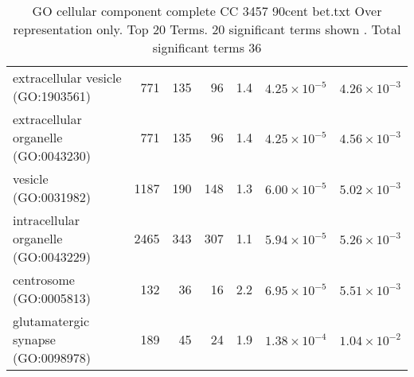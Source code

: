 \begin{table}[ht]
\begin{adjustbox}{width=\textwidth}
\begin{tabular}{lrrrrrr}
  extracellular vesicle (GO:1903561) & 771 & 135 & 96 & 1.4 & $4.25 \times 10^{-5}$ & $4.26 \times 10^{-3}$ \\ 
  extracellular organelle (GO:0043230) & 771 & 135 & 96 & 1.4 & $4.25 \times 10^{-5}$ & $4.56 \times 10^{-3}$ \\ 
  vesicle (GO:0031982) & 1187 & 190 & 148 & 1.3 & $6.00 \times 10^{-5}$ & $5.02 \times 10^{-3}$ \\ 
  intracellular organelle (GO:0043229) & 2465 & 343 & 307 & 1.1 & $5.94 \times 10^{-5}$ & $5.26 \times 10^{-3}$ \\ 
  centrosome (GO:0005813) & 132 & 36 & 16 & 2.2 & $6.95 \times 10^{-5}$ & $5.51 \times 10^{-3}$ \\ 
  glutamatergic synapse (GO:0098978) & 189 & 45 & 24 & 1.9 & $1.38 \times 10^{-4}$ & $1.04 \times 10^{-2}$ \\ 
   \hline
\end{tabular}
\end{adjustbox}
\caption{GO cellular component complete CC 3457 90cent bet.txt Over representation only. Top 20 Terms. 20 significant terms shown . Total significant terms 36} 
\label{tab:GO cellular component complete CC 3457 90cent bet.txt Over representation only. Top 20 Terms. 20 significant terms shown . Total significant terms 36}
\end{table}


